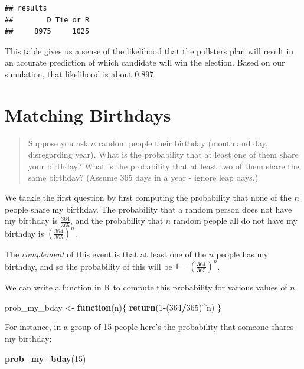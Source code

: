 \documentclass[
]{book}
\newenvironment{Shaded}{\begin{snugshade}}{\end{snugshade}}
\newcommand{\ControlFlowTok}[1]{\textcolor[rgb]{0.13,0.29,0.53}{\textbf{#1}}}
\newcommand{\DecValTok}[1]{\textcolor[rgb]{0.00,0.00,0.81}{#1}}
\newcommand{\FunctionTok}[1]{\textcolor[rgb]{0.13,0.29,0.53}{\textbf{#1}}}
\newcommand{\NormalTok}[1]{#1}
\newcommand{\OtherTok}[1]{\textcolor[rgb]{0.56,0.35,0.01}{#1}}
\newcommand{\SpecialCharTok}[1]{\textcolor[rgb]{0.81,0.36,0.00}{\textbf{#1}}}
\theoremstyle{definition}
\theoremstyle{definition}
\theoremstyle{definition}
\theoremstyle{definition}
\theoremstyle{remark}
\begin{document}
\begin{verbatim}
## results
##        D Tie or R 
##     8975     1025
\end{verbatim}

This table gives us a sense of the likelihood that the pollsters plan will result in an accurate prediction of which candidate will win the election. Based on our simulation, that likelihood is about 0.897.

\section{Matching Birthdays}\label{same-birthday-R}

\begin{quote}
Suppose you ask \(n\) random people their birthday (month and day, disregarding year). What is the probability that at least one of them share your birthday? What is the probability that at least two of them share the same birthday? (Assume 365 days in a year - ignore leap days.)
\end{quote}

We tackle the first question by first computing the probability that none of the \(n\) people share my birthday. The probability that a random person does not have my birthday is \(\frac{364}{365}\), and the probability that \(n\) random people all do not have my birthday is \(\left(\frac{364}{365}\right)^n\).

The \emph{complement} of this event is that at least one of the \(n\) people has my birthday, and so the probability of this will be \(1- \left(\frac{364}{365}\right)^n\).

We can write a function in R to compute this probability for various values of \(n\).

\begin{Shaded}
\begin{Highlighting}[]
\NormalTok{prob\_my\_bday }\OtherTok{\textless{}{-}} \ControlFlowTok{function}\NormalTok{(n)\{}
  \FunctionTok{return}\NormalTok{(}\DecValTok{1}\SpecialCharTok{{-}}\NormalTok{(}\DecValTok{364}\SpecialCharTok{/}\DecValTok{365}\NormalTok{)}\SpecialCharTok{\^{}}\NormalTok{n)}
\NormalTok{\}}
\end{Highlighting}
\end{Shaded}

For instance, in a group of 15 people here's the probability that someone shares my birthday:

\begin{Shaded}
\begin{Highlighting}[]
\FunctionTok{prob\_my\_bday}\NormalTok{(}\DecValTok{15}\NormalTok{)}
\end{Highlighting}
\end{Shaded}
\end{document}
